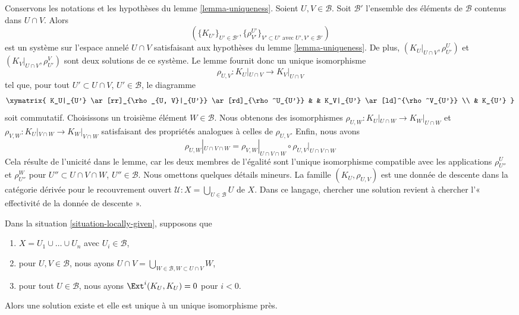 \begin{remark}

\label{remark-uniqueness}

Conservons les notations et les hypothèses du lemme \ref{lemma-uniqueness}. Soient $U, V \in \mathcal{B}$. Soit $\mathcal{B}'$ l'ensemble des éléments de $\mathcal{B}$ contenus dans $U \cap V$. Alors
$$
(\{K_{U'}\}_{U' \in \mathcal{B}'},
\{\rho_{V'}^{U'}\}_{V' \subset U'\text{ avec }U', V' \in \mathcal{B}'})
$$
est un système sur l'espace annelé $U \cap V$
satisfaisant aux hypothèses du lemme \ref{lemma-uniqueness}. De plus, $(K_U|_{U \cap V}, \rho^U_{U'})$ et
$(K_V|_{U \cap V}, \rho^V_{U'})$ sont deux solutions de ce système. Le lemme fournit donc un unique isomorphisme
$$
\rho_{U, V} : K_U|_{U \cap V} \longrightarrow K_V|_{U \cap V}
$$
tel que, pour tout $U' \subset U \cap V$, $U' \in \mathcal{B}$, le diagramme
$$
\xymatrix{
K_U|_{U'} \ar[rr]_{\rho_{U, V}|_{U'}} \ar[rd]_{\rho^U_{U'}} & &
K_V|_{U'} \ar[ld]^{\rho^V_{U'}} \\
& K_{U'}
}
$$
soit commutatif. Choisissons un troisième élément $W \in \mathcal{B}$. Nous obtenons des isomorphismes
$\rho_{U, W} : K_U|_{U \cap W} \to K_W|_{U \cap W}$ et
$\rho_{V, W} : K_U|_{V \cap W} \to K_W|_{V \cap W}$ satisfaisant des propriétés analogues à celles de $\rho_{U, V}$. Enfin, nous avons
$$
\rho_{U, W}|_{U \cap V \cap W} =
\rho_{V, W}|_{U \cap V \cap W} \circ \rho_{U, V}|_{U \cap V \cap W}
$$
Cela résulte de l'unicité dans le lemme, car les deux membres de l'égalité sont l'unique isomorphisme compatible avec les applications $\rho^U_{U''}$ et $\rho^W_{U''}$
pour $U'' \subset U \cap V \cap W$, $U'' \in \mathcal{B}$. Nous omettons quelques détails mineurs. La famille $(K_U, \rho_{U, V})$ est une donnée de descente dans la catégorie dérivée pour le recouvrement ouvert
$\mathcal{U} : X = \bigcup_{U \in \mathcal{B}} U$ de $X$. Dans ce langage, chercher une solution revient à chercher l'« effectivité de la donnée de descente ».

\end{remark}

\begin{lemma}

\label{lemma-solution-in-finite-case}

Dans la situation \ref{situation-locally-given}, supposons que

\begin{enumerate}

\item  $X = U_1 \cup \ldots \cup U_n$ avec $U_i \in \mathcal{B}$,
\item pour $U, V \in \mathcal{B}$, nous ayons
$U \cap V = \bigcup_{W \in \mathcal{B}, W \subset U \cap V} W$,
\item pour tout $U \in \mathcal{B}$, nous ayons $\Ext^i(K_U, K_U) = 0$
pour $i < 0$.

\end{enumerate}

Alors une solution existe et elle est unique à un unique isomorphisme près.

\end{lemma}

